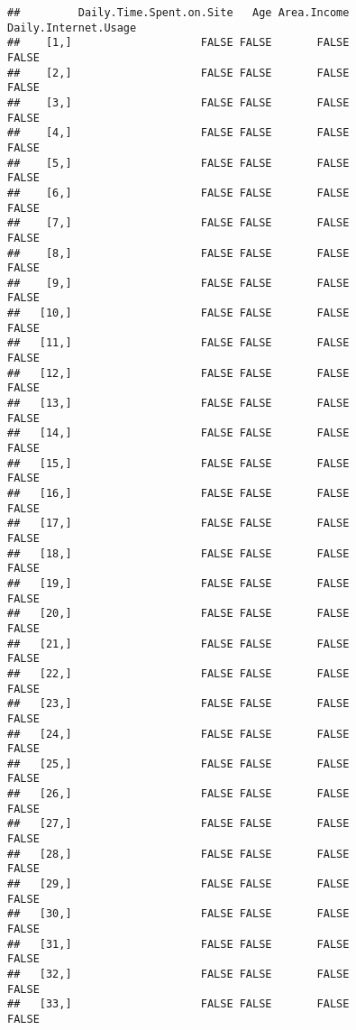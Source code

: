 \documentclass[
]{article}
\begin{document}
\begin{verbatim}
##         Daily.Time.Spent.on.Site   Age Area.Income Daily.Internet.Usage
##    [1,]                    FALSE FALSE       FALSE                FALSE
##    [2,]                    FALSE FALSE       FALSE                FALSE
##    [3,]                    FALSE FALSE       FALSE                FALSE
##    [4,]                    FALSE FALSE       FALSE                FALSE
##    [5,]                    FALSE FALSE       FALSE                FALSE
##    [6,]                    FALSE FALSE       FALSE                FALSE
##    [7,]                    FALSE FALSE       FALSE                FALSE
##    [8,]                    FALSE FALSE       FALSE                FALSE
##    [9,]                    FALSE FALSE       FALSE                FALSE
##   [10,]                    FALSE FALSE       FALSE                FALSE
##   [11,]                    FALSE FALSE       FALSE                FALSE
##   [12,]                    FALSE FALSE       FALSE                FALSE
##   [13,]                    FALSE FALSE       FALSE                FALSE
##   [14,]                    FALSE FALSE       FALSE                FALSE
##   [15,]                    FALSE FALSE       FALSE                FALSE
##   [16,]                    FALSE FALSE       FALSE                FALSE
##   [17,]                    FALSE FALSE       FALSE                FALSE
##   [18,]                    FALSE FALSE       FALSE                FALSE
##   [19,]                    FALSE FALSE       FALSE                FALSE
##   [20,]                    FALSE FALSE       FALSE                FALSE
##   [21,]                    FALSE FALSE       FALSE                FALSE
##   [22,]                    FALSE FALSE       FALSE                FALSE
##   [23,]                    FALSE FALSE       FALSE                FALSE
##   [24,]                    FALSE FALSE       FALSE                FALSE
##   [25,]                    FALSE FALSE       FALSE                FALSE
##   [26,]                    FALSE FALSE       FALSE                FALSE
##   [27,]                    FALSE FALSE       FALSE                FALSE
##   [28,]                    FALSE FALSE       FALSE                FALSE
##   [29,]                    FALSE FALSE       FALSE                FALSE
##   [30,]                    FALSE FALSE       FALSE                FALSE
##   [31,]                    FALSE FALSE       FALSE                FALSE
##   [32,]                    FALSE FALSE       FALSE                FALSE
##   [33,]                    FALSE FALSE       FALSE                FALSE

\end{verbatim}
\end{document}
